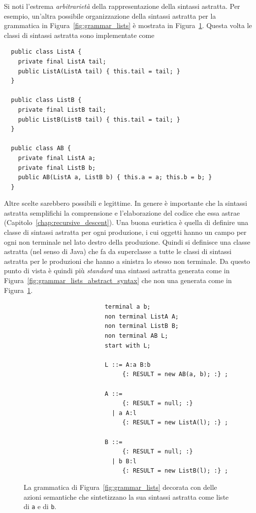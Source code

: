 Si noti l'estrema \emph{arbitrariet\`a} della rappresentazione
della sintassi astratta. Per esempio, un'altra possibile organizzazione
della sintassi astratta per la grammatica in Figura~\ref{fig:grammar_lists}
\`e mostrata in Figura~\ref{fig:grammar_lists_abstract_syntax2}.
Questa volta le classi di sintassi astratta sono implementate come
%
\begin{verbatim}
  public class ListA {
    private final ListA tail;
    public ListA(ListA tail) { this.tail = tail; }
  }

  public class ListB {
    private final ListB tail;
    public ListB(ListB tail) { this.tail = tail; }
  }

  public class AB {
    private final ListA a;
    private final ListB b;
    public AB(ListA a, ListB b) { this.a = a; this.b = b; }
  }
\end{verbatim}

Altre scelte sarebbero possibili e legittime. In genere \`e importante
che la sintassi astratta semplifichi la comprensione e l'elaborazione
del codice che essa astrae (Capitolo~\ref{chap:recursive_descent}).
Una buona euristica \`e quella di definire una classe di sintassi astratta
per ogni produzione, i cui oggetti hanno un campo per ogni non terminale
nel lato destro della produzione. Quindi si definisce una classe astratta
(nel senso di Java) che fa da superclasse a tutte le classi di sintassi
astratta per le produzioni che hanno a sinistra lo stesso non terminale. Da
questo punto di vista \`e quindi
pi\`u \emph{standard} una sintassi astratta generata come in
Figura~\ref{fig:grammar_lists_abstract_syntax} che non una generata come in
Figura~\ref{fig:grammar_lists_abstract_syntax2}.
%
\begin{figure}[t]
\begin{verbatim}
                       terminal a b;
                       non terminal ListA A;
                       non terminal ListB B;
                       non terminal AB L;
                       start with L;

                       L ::= A:a B:b
                            {: RESULT = new AB(a, b); :} ;

                       A ::=
                            {: RESULT = null; :}
                         | a A:l
                            {: RESULT = new ListA(l); :} ;

                       B ::=
                            {: RESULT = null; :}
                         | b B:l
                            {: RESULT = new ListB(l); :} ;
\end{verbatim}
\caption{La grammatica di Figura~\ref{fig:grammar_lists} decorata con delle
         azioni semantiche che sintetizzano la sua sintassi astratta
         come liste di \texttt{a} e di \texttt{b}.}
  \label{fig:grammar_lists_abstract_syntax2}
\end{figure}


